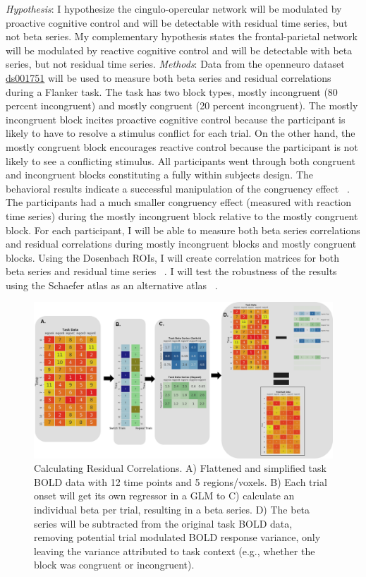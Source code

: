 \documentclass[phd,appendix,figures]{uithesis}
\begin{document}
\begin{itemize}
\textit{Hypothesis}:
I hypothesize the cingulo-opercular network will be modulated by proactive cognitive control and will be detectable with residual time series, but not beta series.
My complementary hypothesis states the frontal-parietal network will be modulated by reactive cognitive control and will be detectable with beta series, but not residual time series. 
\newline
\newline
\textit{Methods}:
Data from the openneuro dataset \href{https://openneuro.org/datasets/ds001751/versions/1.0.0}{ds001751} will be used to measure both beta series and residual correlations during a Flanker task.
The task has two block types, mostly incongruent (80 percent incongruent) and mostly congruent (20 percent incongruent).
The mostly incongruent block incites proactive cognitive control because the participant is likely to have to resolve a stimulus conflict for each trial.
On the other hand, the mostly congruent block encourages reactive control because the participant is not likely to see a conflicting stimulus.
All participants went through both congruent and incongruent blocks constituting a fully within subjects design.
The behavioral results indicate a successful manipulation of the congruency effect ~\citep{Aben2019}.
The participants had a much smaller congruency effect (measured with reaction time series) during the mostly incongruent block relative to the mostly congruent block.
For each participant, I will be able to measure both beta series correlations and residual correlations during mostly incongruent blocks and mostly congruent blocks. 
Using the Dosenbach ROIs, I will create correlation matrices for both beta series and residual time series ~\citep{Dosenbach2010}.
I will test the robustness of the results using the Schaefer atlas as an alternative atlas ~\citep{schaefer2017}.

\begin{figure}[H]%
	\centering
	\includegraphics[width=1\linewidth]{residual_correlations}
	\caption{Calculating Residual Correlations.
	A) Flattened and simplified task BOLD data with 12 time points and 5 regions/voxels.
	B) Each trial onset will get its own regressor in a GLM to
	C) calculate an individual beta per trial, resulting in a beta series.
	D) The beta series will be subtracted from the original task BOLD data, removing potential
	trial modulated BOLD response variance, only leaving the variance attributed to task context (e.g., whether the block was congruent or incongruent).}
	\label{fig:residual_correlations}
\end{figure}


\end{itemize}
\end{document}
